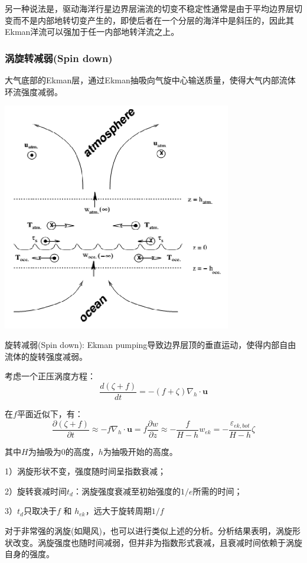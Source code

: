 \documentclass{article}
\begin{document}
另一种说法是，驱动海洋行星边界层湍流的切变不稳定性通常是由于平均边界层切变而不是内部地转切变产生的，即使后者在一个分层的海洋中是斜压的，因此其Ekman洋流可以强加于任一内部地转洋流之上。

\subsubsection{涡旋转减弱(Spin down)}
大气底部的Ekman层，通过Ekman抽吸向气旋中心输送质量，使得大气内部流体环流强度减弱。
\begin{center}
    \includegraphics[width=10cm]{Fig5_2.png}
\end{center}
旋转减弱(Spin down): Ekman pumping导致边界层顶的垂直运动，使得内部自由流体的旋转强度减弱。

考虑一个正压涡度方程：
$$\frac{d(\zeta +f)}{dt}=-(f+\zeta ){{\nabla }_{h}}\cdot\mathbf{u}$$

在$f$平面近似下，有：
$$\frac{\partial(\zeta +f)}{\partial t}\approx-f{{\nabla }_{h}}\cdot\mathbf{u}=f\frac{\partial w}{\partial z}\approx-\frac{f}{H-h}w_{ek}=-\frac{{\varepsilon }_{ek,bot}}{H-h}\zeta$$

其中$H$为抽吸为$0$的高度，$h$为抽吸开始的高度。

1）涡旋形状不变，强度随时间呈指数衰减；

2）旋转衰减时间$t_d$：涡旋强度衰减至初始强度的$1/e$所需的时间；

3）$t_d$只取决于$f$ 和 $h_{ek}$，远大于旋转周期$1/f$

对于非常强的涡旋(如飓风)，也可以进行类似上述的分析。分析结果表明，涡旋形状改变。涡旋强度也随时间减弱，但并非为指数形式衰减，且衰减时间依赖于涡旋自身的强度。
\end{document}
